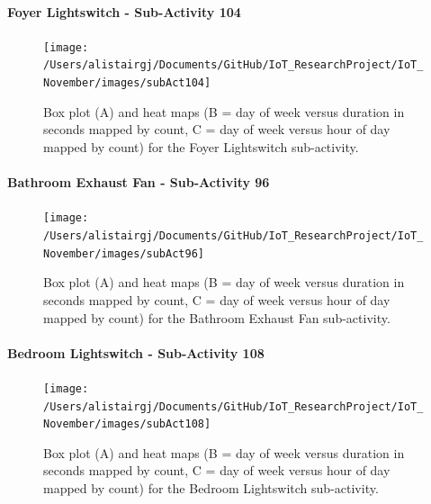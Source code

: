 \documentclass[11pt,]{article}
\let\oldparagraph\paragraph
\renewcommand{\paragraph}[1]{\oldparagraph{#1}\mbox{}}
\begin{document}
\hypertarget{foyer-lightswitch---sub-activity-104}{%
\paragraph{Foyer Lightswitch - Sub-Activity
104}\label{foyer-lightswitch---sub-activity-104}}

\begin{figure}[H]

{\centering \texttt{[image: /Users/alistairgj/Documents/GitHub/IoT\_ResearchProject/IoT\_November/images/subAct104]} 

}

\caption{Box plot (A) and heat maps (B = day of week versus duration in seconds mapped by count, C = day of week versus hour of day mapped by count) for the Foyer Lightswitch sub-activity.}\label{fig:subAct104}
\end{figure}

\hypertarget{bathroom-exhaust-fan---sub-activity-96}{%
\paragraph{Bathroom Exhaust Fan - Sub-Activity
96}\label{bathroom-exhaust-fan---sub-activity-96}}

\begin{figure}[H]

{\centering \texttt{[image: /Users/alistairgj/Documents/GitHub/IoT\_ResearchProject/IoT\_November/images/subAct96]} 

}

\caption{Box plot (A) and heat maps (B = day of week versus duration in seconds mapped by count, C = day of week versus hour of day mapped by count) for the Bathroom Exhaust Fan sub-activity.}\label{fig:subAct96}
\end{figure}

\hypertarget{bedroom-lightswitch---sub-activity-108}{%
\paragraph{Bedroom Lightswitch - Sub-Activity
108}\label{bedroom-lightswitch---sub-activity-108}}

\begin{figure}[H]

{\centering \texttt{[image: /Users/alistairgj/Documents/GitHub/IoT\_ResearchProject/IoT\_November/images/subAct108]} 

}

\caption{Box plot (A) and heat maps (B = day of week versus duration in seconds mapped by count, C = day of week versus hour of day mapped by count) for the Bedroom Lightswitch sub-activity.}\label{fig:subAct108}
\end{figure}
\end{document}
